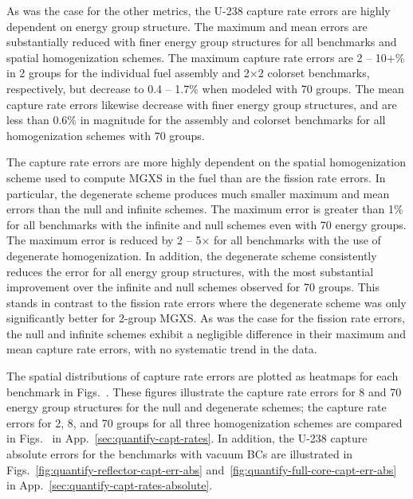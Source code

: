 As was the case for the other metrics, the U-238 capture rate errors are highly dependent on energy group structure. The maximum and mean errors are substantially reduced with finer energy group structures for all benchmarks and spatial homogenization schemes. The maximum capture rate errors are 2 -- 10+\% in 2 groups for the individual fuel assembly and 2$\times$2 colorset benchmarks, respectively, but decrease to 0.4 -- 1.7\% when modeled with 70 groups. The mean capture rate errors likewise decrease with finer energy group structures, and are less than 0.6\% in magnitude for the assembly and colorset benchmarks for all homogenization schemes with 70 groups.

The capture rate errors are more highly dependent on the spatial homogenization scheme used to compute \ac{MGXS} in the fuel than are the fission rate errors. In particular, the degenerate scheme produces much smaller maximum and mean errors than the null and infinite schemes. The maximum error is greater than 1\% for all benchmarks with the infinite and null schemes even with 70 energy groups. The maximum error is reduced by 2 -- 5$\times$ for all benchmarks with the use of degenerate homogenization. In addition, the degenerate scheme consistently reduces the error for all energy group structures, with the most substantial improvement over the infinite and null schemes observed for 70 groups. This stands in contrast to the fission rate errors where the degenerate scheme was only significantly better for 2-group \ac{MGXS}. As was the case for the fission rate errors, the null and infinite schemes exhibit a negligible difference in their maximum and mean capture rate errors, with no systematic trend in the data.

The spatial distributions of capture rate errors are plotted as heatmaps for each benchmark in Figs.~. These figures illustrate the capture rate errors for 8 and 70 energy group structures for the null and degenerate schemes; the capture rate errors for 2, 8, and 70 groups for all three homogenization schemes are compared in Figs.~ in App.~\ref{sec:quantify-capt-rates}. In addition, the U-238 capture absolute errors for the benchmarks with vacuum \acp{BC} are illustrated in Figs.~\ref{fig:quantify-reflector-capt-err-abs} and~\ref{fig:quantify-full-core-capt-err-abs} in App.~\ref{sec:quantify-capt-rates-absolute}.

